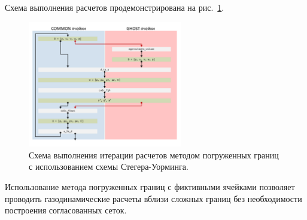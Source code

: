 Схема выполнения расчетов продемонстрирована на рис.~\ref{fig:text_4_ibm_immersed_boundary_method_cheme}.

\begin{figure}[ht]
\centering
\includegraphics[width=0.6\textwidth]{./pics/text_4_ibm/immersed_boundary_method_scheme.pdf}
\singlespacing
{}\caption{Схема выполнения итерации расчетов методом погруженных границ с использованием схемы Стегера-Уорминга.}
\label{fig:text_4_ibm_immersed_boundary_method_cheme}
\end{figure}

Использование метода погруженных границ с фиктивными ячейками позволяет проводить газодинамические расчеты вблизи сложных границ без необходимости построения согласованных сеток.



